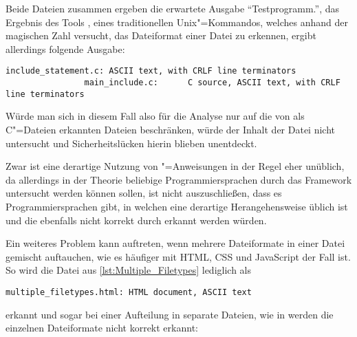             

            Beide Dateien zusammen ergeben die erwartete Ausgabe
            \enquote{Testprogramm.},
            das Ergebnis des Tools
            ,
            eines traditionellen Unix"=Kommandos,
            welches anhand der magischen Zahl versucht,
            das Dateiformat einer Datei zu erkennen,
            ergibt allerdings folgende Ausgabe:

            \begin{lstlisting}[caption={Ausgabe von file}, gobble=16]
                include_statement.c: ASCII text, with CRLF line terminators
                main_include.c:      C source, ASCII text, with CRLF line terminators
            \end{lstlisting}

            Würde man sich in diesem Fall also für die Analyse nur auf die von
             als C"=Dateien erkannten Dateien beschränken,
            würde der Inhalt der Datei
             nicht untersucht und
            Sicherheitslücken hierin blieben unentdeckt.

            Zwar ist eine derartige Nutzung von
            "=Anweisungen in der Regel eher unüblich,
            da allerdings in der Theorie beliebige Programmiersprachen durch das Framework untersucht werden können sollen,
            ist nicht auszuschließen,
            dass es Programmiersprachen gibt,
            in welchen eine derartige Herangehensweise üblich ist und
            die ebenfalls nicht korrekt durch
             erkannt werden würden.

            Ein weiteres Problem kann auftreten,
            wenn mehrere Dateiformate in einer Datei gemischt auftauchen,
            wie es häufiger mit
            \gls{HTML},
            \gls{CSS} und
            JavaScript der Fall ist.
            So wird die Datei aus
            \vref{lst:Multiple_Filetypes} lediglich als

            \begin{lstlisting}[gobble=16]
                multiple_filetypes.html: HTML document, ASCII text
            \end{lstlisting}

            erkannt und
            sogar bei einer Aufteilung in separate Dateien,
            wie in
             werden die einzelnen Dateiformate nicht korrekt erkannt:

